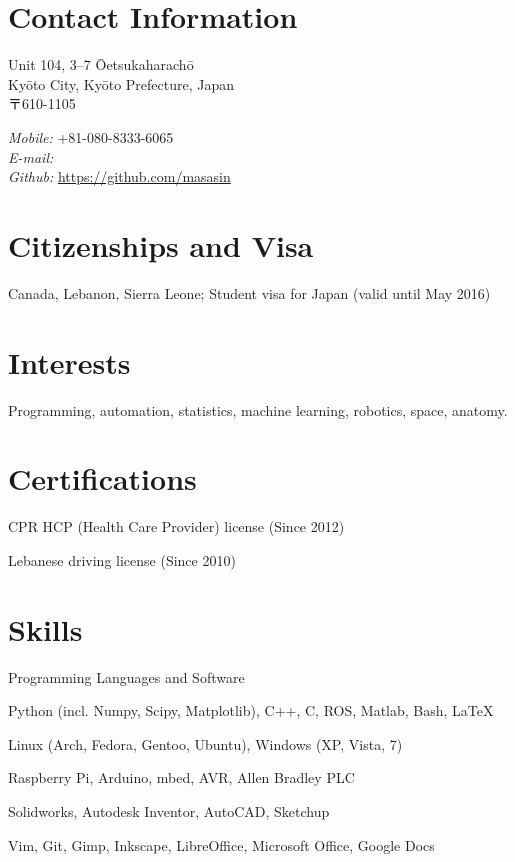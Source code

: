 \documentclass[10pt, a4paper]{article}
\begin{document}
\thispagestyle{plain}

\section{Contact Information}

\vspace{0.14cm}
\begin{minipage}{0.5\textwidth}
Unit 104, 3--7 Ōetsukaharachō\\
Kyōto City, Kyōto Prefecture, Japan\\
〒610-1105
\end{minipage}
\begin{minipage}{0.5\textwidth}
  \flushright
  \emph{Mobile:} +81-080-8333-6065\\
  \emph{E-mail:} \\
  \emph{Github:} \url{https://github.com/masasin}
\end{minipage}

\section{Citizenships and Visa}
Canada, Lebanon, Sierra Leone; Student visa for Japan (valid until May 2016)

\section{Interests}
Programming, automation, statistics, machine learning, robotics, space, anatomy.

\section{Certifications}
\begin{innerlist}
  \item CPR HCP (Health Care Provider) license (Since 2012)
  \item Lebanese driving license (Since 2010)
\end{innerlist}

\section{Skills}
Programming Languages and Software
\begin{innerlist}
  \item Python (incl. Numpy, Scipy, Matplotlib), C++, C, ROS, Matlab, Bash, \LaTeX
  \item Linux (Arch, Fedora, Gentoo, Ubuntu), Windows (XP, Vista, 7)
  \item Raspberry Pi, Arduino, mbed, AVR, Allen Bradley PLC
  \item Solidworks, Autodesk Inventor, AutoCAD, Sketchup
  \item Vim, Git, Gimp, Inkscape, LibreOffice, Microsoft Office, Google Docs
\end{innerlist}
\end{document}
